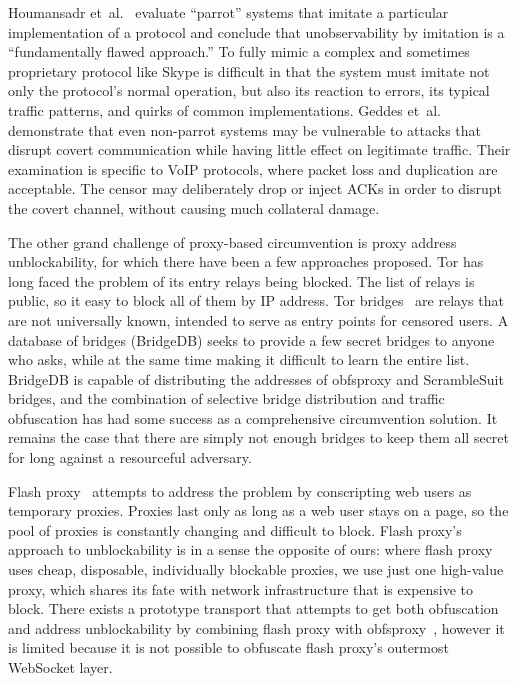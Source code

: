\documentclass{article}
\begin{document}
Houmansadr et~al.~\cite{parrot} evaluate ``parrot'' systems that imitate a particular implementation of a protocol
and conclude that unobservability by imitation is a ``fundamentally
flawed approach.''
To fully mimic a complex and sometimes proprietary protocol like Skype
is difficult in that the system must imitate not only the protocol's normal operation, but also its reaction to errors,
its typical traffic patterns, and quirks of common implementations.
Geddes et~al.~\cite{acks}
demonstrate that even non-parrot systems may be vulnerable to
attacks that disrupt covert communication while having little effect
on legitimate traffic. Their examination is specific to VoIP protocols,
where packet loss and duplication are acceptable. The censor may
deliberately drop or inject ACKs in order to disrupt the covert channel, without causing
much collateral damage.


The other grand challenge of proxy-based circumvention is proxy address unblockability,
for which there have been a few approaches proposed.
Tor has long faced the problem of its entry relays being blocked. The list of
relays is public, so it easy to block all of them by IP address. Tor
bridges~\cite{tor-blocking} are relays that are not universally known, intended
to serve as entry points for censored users. A database of bridges (BridgeDB) seeks to
provide a few secret bridges to anyone who asks, while at the same time making it
difficult to learn the entire list. BridgeDB is capable of distributing
the addresses of obfsproxy and ScrambleSuit bridges, and the combination
of selective bridge distribution and traffic obfuscation has had some success as a comprehensive circumvention solution.
It remains the case that there are simply not enough bridges to keep them all secret for long against a resourceful adversary.

Flash proxy~\cite{flashproxy} attempts to address the problem  by
conscripting web users as temporary proxies. Proxies last only as long as a web
user stays on a page, so the pool of proxies is constantly changing and
difficult to block.
Flash proxy's approach to unblockability is in a sense
the opposite of ours: where flash proxy uses cheap, disposable, individually blockable proxies,
we use just one high-value proxy, which shares its fate with network
infrastructure that is expensive to block.
There exists a prototype transport that attempts to get both
obfuscation and address unblockability by combining flash proxy
with obfsproxy~\cite{obfs-flash}, however it is limited because it is not
possible to obfuscate flash proxy's outermost WebSocket layer.
\end{document}
